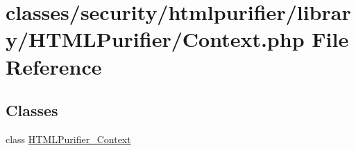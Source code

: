 \hypertarget{Context_8php}{\section{classes/security/htmlpurifier/library/\+H\+T\+M\+L\+Purifier/\+Context.php File Reference}
\label{Context_8php}
}
\subsection*{Classes}
\begin{DoxyCompactItemize}
\item 
class \hyperlink{classHTMLPurifier__Context}{H\+T\+M\+L\+Purifier\+\_\+\+Context}
\end{DoxyCompactItemize}
